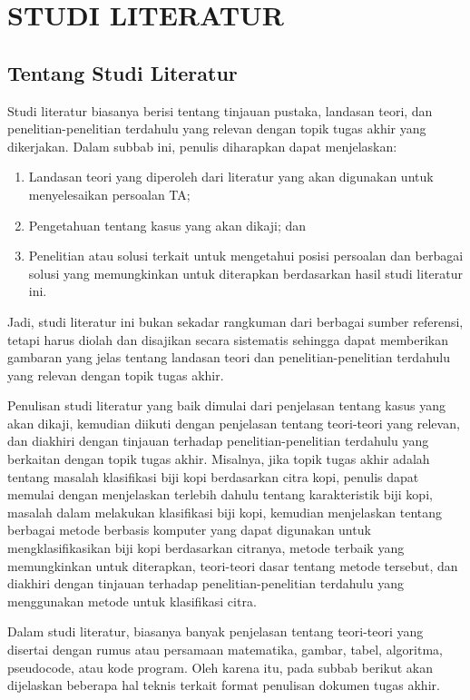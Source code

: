 \cleardoublepage %
\chapter{STUDI LITERATUR}
\label{chap:studi-literatur}
\section{Tentang Studi Literatur}
Studi literatur biasanya berisi tentang tinjauan pustaka, landasan teori, dan penelitian-penelitian terdahulu yang relevan dengan topik tugas akhir yang dikerjakan.
Dalam subbab ini, penulis diharapkan dapat menjelaskan:
\begin{enumerate}
  \item Landasan teori yang diperoleh dari literatur yang akan digunakan untuk menyelesaikan persoalan TA;
  \item Pengetahuan tentang kasus yang akan dikaji; dan
  \item Penelitian atau solusi terkait untuk mengetahui posisi persoalan dan berbagai solusi yang memungkinkan untuk diterapkan berdasarkan hasil studi literatur ini.
\end{enumerate}
Jadi, studi literatur ini bukan sekadar rangkuman dari berbagai sumber referensi, tetapi harus diolah dan disajikan secara sistematis sehingga dapat memberikan gambaran yang jelas tentang landasan teori dan penelitian-penelitian terdahulu yang relevan dengan topik tugas akhir.

Penulisan studi literatur yang baik dimulai dari penjelasan tentang kasus yang akan dikaji, kemudian diikuti dengan penjelasan tentang teori-teori yang relevan, dan diakhiri dengan tinjauan terhadap penelitian-penelitian terdahulu yang berkaitan dengan topik tugas akhir.
Misalnya, jika topik tugas akhir adalah tentang masalah klasifikasi biji kopi berdasarkan citra kopi, 
penulis dapat memulai dengan menjelaskan terlebih dahulu tentang karakteristik biji kopi, masalah dalam melakukan klasifikasi biji kopi, 
kemudian menjelaskan tentang berbagai metode berbasis komputer yang dapat digunakan untuk mengklasifikasikan biji kopi berdasarkan citranya, 
metode terbaik yang memungkinkan untuk diterapkan, teori-teori dasar tentang metode tersebut, dan diakhiri dengan tinjauan terhadap penelitian-penelitian terdahulu yang menggunakan metode untuk klasifikasi citra.

Dalam studi literatur, biasanya banyak penjelasan tentang teori-teori yang disertai dengan rumus atau persamaan matematika, gambar, tabel, algoritma, pseudocode, atau kode program.
Oleh karena itu, pada subbab berikut akan dijelaskan beberapa hal teknis terkait format penulisan dokumen tugas akhir.

